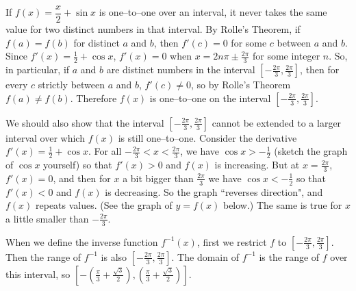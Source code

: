 \begin{solution}
If $f(x)=\dfrac{x}{2}+\sin x$ is one--to--one over an interval, it never takes the same value for two distinct numbers in that interval. By Rolle's Theorem, if $f(a)=f(b)$ for distinct $a$ and $b$, then
$f'(c)=0$ for some $c$ between $a$ and $b$. Since $f'(x)=\frac{1}{2}+\cos x$,
$f'(x)=0$ when $x=2n\pi\pm\frac{2\pi}{3}$ for some integer $n$. So, in particular, if  $a$ and $b$ are distinct numbers in the interval $\left[-\frac{2\pi}{3},\frac{2\pi}{3}\right]$, then for every $c$ strictly between $a$ and $b$, $f'(c) \neq 0$, so by Rolle's Theorem $f(a) \neq f(b)$. Therefore $f(x)$ is one--to--one on the interval $\left[-\frac{2\pi}{3},\frac{2\pi}{3}\right]$.

We should also show that the interval $\left[-\frac{2\pi}{3},\frac{2\pi}{3}\right]$ cannot be extended to a larger interval over which $f(x)$ is still one--to--one. %
Consider the derivative $f'(x) = \frac{1}{2}+\cos x$.
           For all $-\frac{2\pi}{3} < x < \frac{2\pi}{3}$, we have
           $\cos x > -\frac{1}{2}$ (sketch the graph of $\cos x$
           yourself) so that $f'(x)>0$ and $f(x)$ is
           increasing. But at $x=\frac{2\pi}{3}$, $f'(x)=0$, and then
           for $x$ a bit bigger than  $\frac{2\pi}{3}$ we have
           $\cos x < -\frac{1}{2}$ so that $f'(x)<0$ and $f(x)$ is
           decreasing. So the graph ``reverses direction", and $f(x)$
           repeats values. (See the graph of $y=f(x)$ below.) The
           same is true for $x$ a little smaller than $-\frac{2\pi}{3}.$

\begin{center}\end{center}



When we define the inverse function $f^{-1}(x)$, first we restrict $f$ to $\left[-\frac{2\pi}{3},\frac{2\pi}{3}\right]$. Then the range of $f^{-1}$ is also $\left[-\frac{2\pi}{3},\frac{2\pi}{3}\right]$.  The domain of $f^{-1}$ is the range of $f$ over this interval, so
$\left[-\left(\frac{\pi}{3}+\frac{\sqrt{3}}{2}\right),\left(\frac{\pi}{3}+\frac{\sqrt{3}}{2}\right)\right]$.
\end{solution}


